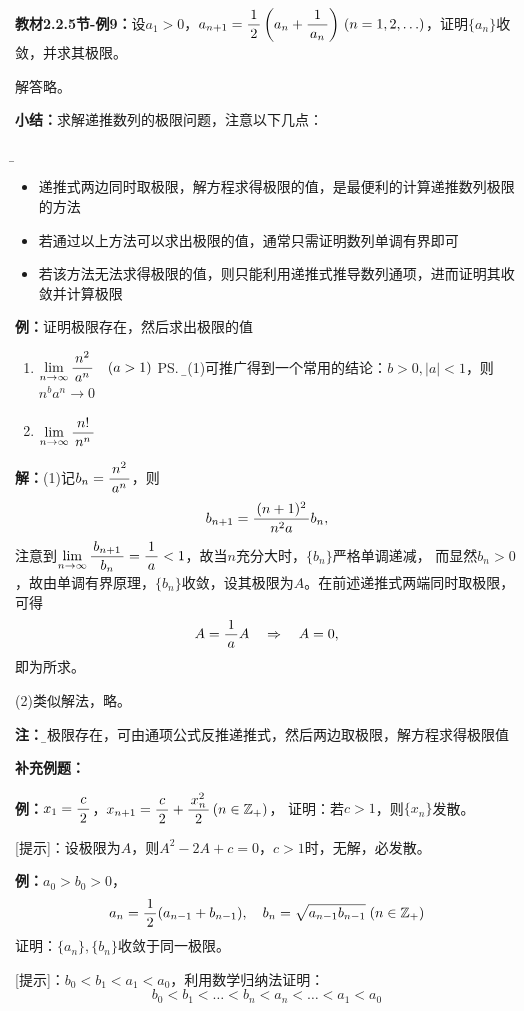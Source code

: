 {\bf 教材2.2.5节-例9：}设$a_1>0$，$a_{n+1}=\displaystyle\frac{\,{1}\,}{\,{2}\,}\left(a_n+\displaystyle\frac{\,{1}\,}{\,{a_n}\,}\right)\,
(n=1,2,\ldots)$，证明$\{a_n\}$收敛，并求其极限。

解答略。

{\bf 小结：}求解递推数列的极限问题，注意以下几点：{\b
\begin{itemize}
  \setlength{\itemindent}{1cm}
  \item 递推式两边同时取极限，解方程求得极限的值，是最便利的计算递推数列极限的方法
  \item 若通过以上方法可以求出极限的值，通常只需证明数列单调有界即可
  \item 若该方法无法求得极限的值，则只能利用递推式推导数列通项，进而证明其收敛并计算极限
\end{itemize}}

{\bf 例：}证明极限存在，然后求出极限的值
\begin{enumerate}[(1)]
  \setlength{\itemindent}{1cm}
  \item $\lim\limits_{n\to\infty}\displaystyle\frac{\,{n^2}\,}{\,{a^n}\,}\quad (a>1)$%
  \ps{\b 由(1)可推广得到一个常用的结论：$b>0,|a|<1$，则$n^ba^n\to 0$}
  \item $\lim\limits_{n\to\infty}\displaystyle\frac{\,{n!}\,}{\,{n^n}\,}$%
\end{enumerate}

{\bf 解：}(1)\;记$b_n=\displaystyle\frac{\,{n^2}\,}{\,{a^n}\,}$，则
$$b_{n+1}=\displaystyle\frac{\,{(n+1)^2}\,}{\,{n^2a}\,}b_n,$$
注意到$\lim\limits_{n\to\infty}\displaystyle\frac{\,{b_{n+1}}\,}{\,{b_n}\,}=\displaystyle\frac{\,{1}\,}{\,{a}\,}<1$，故当$n$充分大时，$\{b_n\}$严格单调递减，
而显然$b_n>0$，故由单调有界原理，$\{b_n\}$收敛，设其极限为$A$。在前述递推式两端同时取极限，
可得
$$A=\displaystyle\frac{\,{1}\,}{\,{a}\,}A\quad\Rightarrow\quad A=0,$$
即为所求。

(2)\;类似解法，略。

{\bf 注：}{\b 若极限存在，可由通项公式反推递推式，然后两边取极限，解方程求得极限值}

{\bf 补充例题：}

{\bf 例：}$x_1=\displaystyle\frac{\,{c}\,}{\,{2}\,}$，$x_{n+1}=\displaystyle\frac{\,{c}\,}{\,{2}\,}+\displaystyle\frac{\,{x_n^2}\,}{\,{2}\,}\,(n\in\mathbb{Z}_+)$，
证明：若$c>1$，则$\{x_n\}$发散。

[提示]：设极限为$A$，则$A^2-2A+c=0$，$c>1$时，无解，必发散。

{\bf 例：}$a_0>b_0>0$，
$$a_n=\displaystyle\frac{\,{1}\,}{\,{2}\,}(a_{n-1}+b_{n-1}),\quad
b_n=\sqrt{a_{n-1}b_{n-1}}\;(n\in\mathbb{Z}_+)$$
证明：$\{a_n\},\{b_n\}$收敛于同一极限。

[提示]：$b_0<b_1<a_1<a_0$，利用数学归纳法证明：
$$b_0<b_1<\ldots<b_n<a_n<\ldots<a_1<a_0$$

